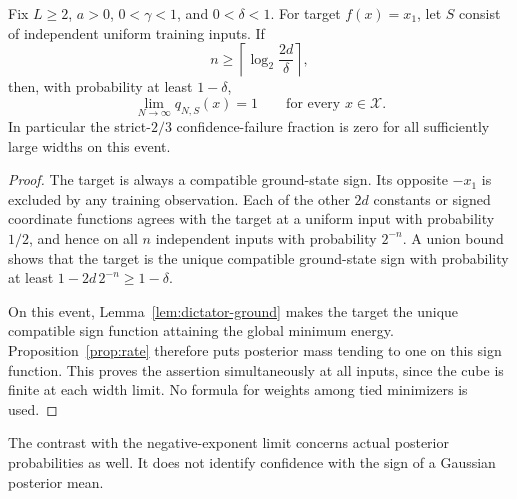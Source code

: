 \begin{theorem}
\label{thm:dictator-fast}
Fix $L\ge2$, $a>0$, $0<\gamma<1$, and $0<\delta<1$.
For target $f(x)=x_1$, let $S$ consist of independent uniform
training inputs. If
\[
 n\ge\left\lceil\log_2\frac{2d}{\delta}\right\rceil,
\]
then, with probability at least $1-\delta$,
\[
 \lim_{N\to\infty}q_{N,S}(x)=1\qquad\text{for every }x\in\mathcal X.
\]
In particular the strict-$2/3$ confidence-failure fraction is zero
for all sufficiently large widths on this event.
\end{theorem}
\begin{proof}
The target is always a compatible ground-state sign. Its opposite
$-x_1$ is excluded by any training observation. Each of the other
$2d$ constants or signed coordinate functions agrees with the target
at a uniform input with probability $1/2$, and hence on all $n$
independent inputs with probability $2^{-n}$. A union bound shows
that the target is the unique compatible ground-state sign with
probability at least $1-2d\,2^{-n}\ge1-\delta$.

On this event, Lemma~\ref{lem:dictator-ground} makes the target the
unique compatible sign function attaining the global minimum
energy. Proposition~\ref{prop:rate} therefore puts posterior mass
tending to one on this sign function. This proves the assertion
simultaneously at all inputs, since the cube is finite at each width
limit. No formula for weights among tied minimizers is used.
\end{proof}

The contrast with the negative-exponent limit concerns actual
posterior probabilities as well. It does not identify confidence with
the sign of a Gaussian posterior mean.

